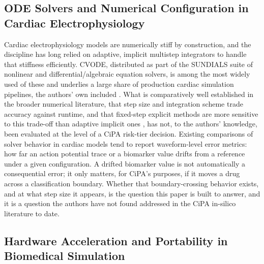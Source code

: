 \documentclass[journal]{IEEEtran}
\begin{document}
\subsection{ODE Solvers and Numerical Configuration in Cardiac Electrophysiology}

Cardiac electrophysiology models are numerically stiff by construction, and the discipline has long relied on adaptive, implicit multistep integrators to handle that stiffness efficiently. CVODE, distributed as part of the SUNDIALS suite of nonlinear and differential/algebraic equation solvers, is among the most widely used of these and underlies a large share of production cardiac simulation pipelines, the authors' own included \cite{hindmarsh2005}. What is comparatively well established in the broader numerical literature, that step size and integration scheme trade accuracy against runtime, and that fixed-step explicit methods are more sensitive to this trade-off than adaptive implicit ones \cite{benchmarking2021}, has not, to the authors' knowledge, been evaluated at the level of a CiPA risk-tier decision. Existing comparisons of solver behavior in cardiac models tend to report waveform-level error metrics: how far an action potential trace or a biomarker value drifts from a reference under a given configuration. A drifted biomarker value is not automatically a consequential error; it only matters, for CiPA's purposes, if it moves a drug across a classification boundary. Whether that boundary-crossing behavior exists, and at what step size it appears, is the question this paper is built to answer, and it is a question the authors have not found addressed in the CiPA in-silico literature to date.

\subsection{Hardware Acceleration and Portability in Biomedical Simulation}
\end{document}
